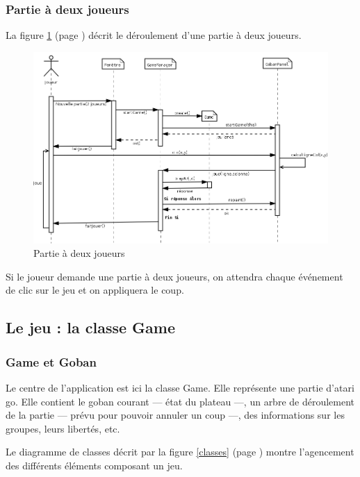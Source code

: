 \documentclass[11pt,a4paper,titlepage,french]{article}
\begin{document}
			\subsubsection{Partie à deux joueurs}

				La figure \ref{twoplayers} (page \pageref{twoplayers}) décrit le déroulement d'une partie à deux joueurs.

				\begin{figure}[ohbt]
					\begin{center}
						\includegraphics[width=1.1\textwidth]{./IA_2J.png}
					\end{center}
					\caption{Partie à deux joueurs}
					\label{twoplayers}
				\end{figure}

				Si le joueur demande une partie à deux joueurs, on attendra chaque événement de clic sur le jeu et on appliquera le coup.

		\subsection{Le jeu : la classe Game}\label{howgame}


			\subsubsection{Game et Goban}

			Le centre de l'application est ici la classe Game. Elle représente une partie d'atari go. Elle contient le goban courant --- état du plateau ---, un arbre de déroulement de la partie --- prévu pour pouvoir annuler un coup ---, des informations sur les groupes, leurs libertés, etc.

			Le diagramme de classes décrit par la figure \ref{classes} (page \pageref{classes}) montre l'agencement des différents éléments composant un jeu.
\end{document}
